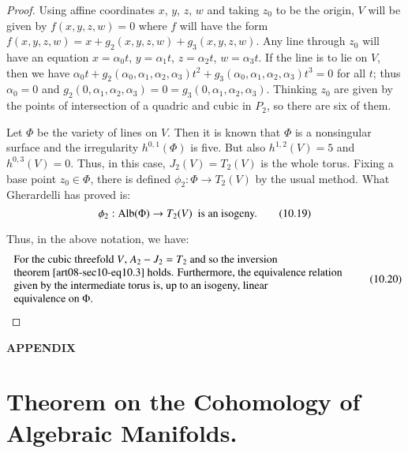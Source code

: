 \begin{proof}
Using affine coordinates $x$, $y$, $z$, $w$ and taking $z_{0}$ to be the origin, $V$ will be given by $f(x,y,z,w)=0$ where $f$ will have the form $f(x,y,z,w)=x+g_{2}(x,y,z,w)+g_{3}(x,y,z,w)$. Any line through $z_{0}$ will have an equation $x=\alpha_{0}t$, $y=\alpha_{1}t$, $z=\alpha_{2}t$, $w=\alpha_{3}t$. If the line is to lie on $V$, then we have $\alpha_{0}t+g_{2}(\alpha_{0},\alpha_{1},\alpha_{2},\alpha_{3})t^{2}+g_{3}(\alpha_{0},\alpha_{1},\alpha_{2},\alpha_{3})t^{3}=0$ for all $t$; thus $\alpha_{0}=0$ and $g_{2}(0,\alpha_{1},\alpha_{2},\alpha_{3})=0=g_{3}(0,\alpha_{1},\alpha_{2},\alpha_{3})$. Thinking $z_{0}$ are given by the points of intersection of a quadric and cubic in $P_{2}$, so there are six of them.

Let $\Phi$ be the variety of lines on $V$. Then it is known that $\Phi$ is a nonsingular surface and the irregularity $h^{0,1}(\Phi)$ is five. But also $h^{1,2}(V)=5$ and $h^{0,3}(V)=0$. Thus, in this case, $J_{2}(V)=T_{2}(V)$ is the whole torus. Fixing a base point $z_{0}\in \Phi$, there is defined $\phi_{2}:\Phi\to T_{2}(V)$ by the usual method. What Gherardelli has proved is:
\begin{equation*}
\phi_{2}:\operatorname{\mathrm{Alb}}(\Phi)\to T_{2}(V)\text{~ is an isogeny.}\tag{10.19}\label{art08-sec10-eq10.19}
\end{equation*}

Thus, in the above notation, we have:
\begin{equation*}
\begin{array}{l}
\text{For the cubic threefold $V$, $A_{2}-J_{2}=T_{2}$ and so the inversion}\\
\text{theorem \eqref{art08-sec10-eq10.3} holds. Furthermore, the equivalence relation}\\
\text{given by the intermediate torus is, up to an isogeny, linear}\\
\text{equivalence on $\Phi$.}
\end{array}\tag{10.20}\label{art08-sec10-eq10.20}
\end{equation*}
\end{proof}


\newpage

\begin{center}
{\Large\bf APPENDIX}
\end{center}

\renewcommand\thesection{\Alph{section}}
\setcounter{section}{0}
\section{Theorem on the Cohomology of Algebraic Manifolds.}\label{art08-app-A}

